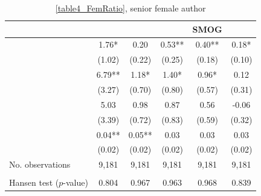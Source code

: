 \begin{table}
    \footnotesize
    \centering
    \begin{threeparttable}
        \caption{\autoref{table4_FemRatio}, senior female author}
        \label{table4_FemSenior}
        \begin{tabular}{p{4cm}S@{}S@{}S@{}S@{}S@{}}
            \toprule
            &{}&{}&{}&{SMOG}&{}\\
            \midrule
            &        1.76*  &        0.20   &        0.53** &        0.40** &        0.18*  \\
                                          &      {(1.02)}   &      {(0.22)}   &      {(0.25)}   &      {(0.18)}   &      {(0.10)}   \\
            &        6.79** &        1.18*  &        1.40*  &        0.96*  &        0.12   \\
                                          &      {(3.27)}   &      {(0.70)}   &      {(0.80)}   &      {(0.57)}   &      {(0.31)}   \\
            &        5.03   &        0.98   &        0.87   &        0.56   &       -0.06   \\
                                          &      {(3.39)}   &      {(0.72)}   &      {(0.83)}   &      {(0.59)}   &      {(0.32)}   \\
            &        0.04** &        0.05** &        0.03   &        0.03   &        0.03   \\
                                          &      {(0.02)}   &      {(0.02)}   &      {(0.02)}   &      {(0.02)}   &      {(0.02)}   \\
            \midrule
            No. observations      &       9,181   &       9,181   &       9,181   &       9,181   &       9,181   \\
             \\\quad Hansen test (\(p\)-value)&       0.804   &       0.967   &       0.963   &       0.968   &       0.839   \\

\end{tabular}
\end{threeparttable}
\end{table}
